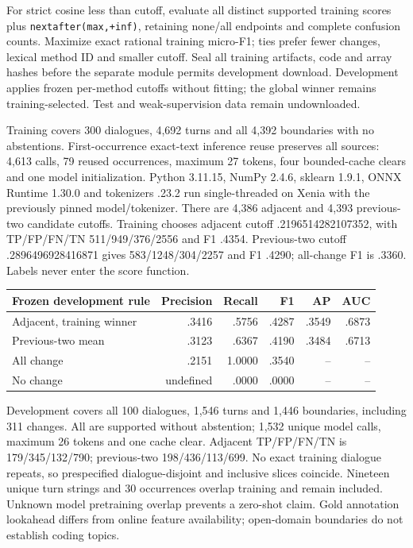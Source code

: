 \documentclass[11pt]{article}
\begin{document}
For strict cosine less than cutoff, evaluate all distinct supported training
scores plus \texttt{nextafter(max,+inf)}, retaining none/all endpoints and
complete confusion counts. Maximize exact rational training micro-F1; ties prefer
fewer changes, lexical method ID and smaller cutoff. Seal all training artifacts,
code and array hashes before the separate module permits development download.
Development applies frozen per-method cutoffs without fitting; the global winner
remains training-selected. Test and weak-supervision data remain undownloaded.

Training covers 300 dialogues, 4,692 turns and all 4,392 boundaries with no
abstentions. First-occurrence exact-text inference reuse preserves all sources:
4,613 calls, 79 reused occurrences, maximum 27 tokens, four bounded-cache clears
and one model initialization. Python 3.11.15, NumPy 2.4.6, sklearn 1.9.1,
ONNX Runtime 1.30.0 and tokenizers .23.2 run single-threaded on Xenia with the
previously pinned model/tokenizer. There are 4,386 adjacent and 4,393 previous-two
candidate cutoffs. Training chooses adjacent cutoff .2196514282107352, with
TP/FP/FN/TN 511/949/376/2556 and F1 .4354. Previous-two cutoff
.2896496928416871 gives 583/1248/304/2257 and F1 .4290; all-change F1 is .3360.
Labels never enter the score function.

\begin{center}\begin{tabular}{lrrrrr}\toprule
Frozen development rule & Precision & Recall & F1 & AP & AUC\\\midrule
Adjacent, training winner & .3416 & .5756 & .4287 & .3549 & .6873\\
Previous-two mean & .3123 & .6367 & .4190 & .3484 & .6713\\
All change & .2151 & 1.0000 & .3540 & -- & --\\
No change & undefined & .0000 & .0000 & -- & --\\\bottomrule
\end{tabular}\end{center}
Development covers all 100 dialogues, 1,546 turns and 1,446 boundaries, including
311 changes. All are supported without abstention; 1,532 unique model calls,
maximum 26 tokens and one cache clear. Adjacent TP/FP/FN/TN is 179/345/132/790;
previous-two 198/436/113/699. No exact training dialogue repeats, so prespecified
dialogue-disjoint and inclusive slices coincide. Nineteen unique turn strings
and 30 occurrences overlap training and remain included. Unknown model pretraining
overlap prevents a zero-shot claim. Gold annotation lookahead differs from online
feature availability; open-domain boundaries do not establish coding topics.
\end{document}
